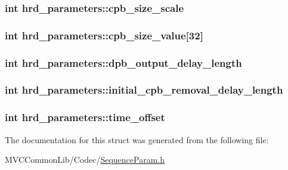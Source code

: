 \label{structhrd__parameters_a190beef0ba6621955e55235eaa3adf87}
\hypertarget{structhrd__parameters_a1609158ce4cbe36e43435936d38b8f59}{
\subsubsection[{cpb\_\-size\_\-scale}]{\setlength{\rightskip}{0pt plus 5cm}int {\bf hrd\_\-parameters::cpb\_\-size\_\-scale}}}
\label{structhrd__parameters_a1609158ce4cbe36e43435936d38b8f59}
\hypertarget{structhrd__parameters_a7a2bb5e5dc6c92094669161b33fa5e61}{
\subsubsection[{cpb\_\-size\_\-value}]{\setlength{\rightskip}{0pt plus 5cm}int {\bf hrd\_\-parameters::cpb\_\-size\_\-value}\mbox{[}32\mbox{]}}}
\label{structhrd__parameters_a7a2bb5e5dc6c92094669161b33fa5e61}
\hypertarget{structhrd__parameters_a5c0bcd60b7cc600016714f0634b8e86c}{
\subsubsection[{dpb\_\-output\_\-delay\_\-length}]{\setlength{\rightskip}{0pt plus 5cm}int {\bf hrd\_\-parameters::dpb\_\-output\_\-delay\_\-length}}}
\label{structhrd__parameters_a5c0bcd60b7cc600016714f0634b8e86c}
\hypertarget{structhrd__parameters_a813b2fc9ba06ba6c074610f2469ec2cf}{
\subsubsection[{initial\_\-cpb\_\-removal\_\-delay\_\-length}]{\setlength{\rightskip}{0pt plus 5cm}int {\bf hrd\_\-parameters::initial\_\-cpb\_\-removal\_\-delay\_\-length}}}
\label{structhrd__parameters_a813b2fc9ba06ba6c074610f2469ec2cf}
\hypertarget{structhrd__parameters_a433e874835df091a3754948b51714567}{
\subsubsection[{time\_\-offset}]{\setlength{\rightskip}{0pt plus 5cm}int {\bf hrd\_\-parameters::time\_\-offset}}}
\label{structhrd__parameters_a433e874835df091a3754948b51714567}


The documentation for this struct was generated from the following file:\begin{DoxyCompactItemize}
\item 
MVCCommonLib/Codec/\hyperlink{_sequence_param_8h}{SequenceParam.h}\end{DoxyCompactItemize}

